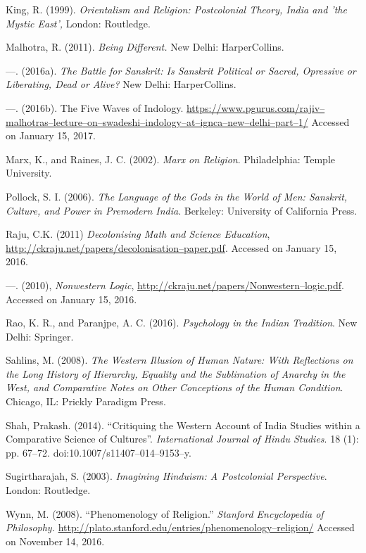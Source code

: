 \begin{thebibliography}{99}
  King, R. (1999). \textit{Orientalism and Religion: Postcolonial Theory, India and 'the Mystic East',} London: Routledge.

  Malhotra, R. (2011). \textit{Being Different.} New Delhi: HarperCollins.

  —. (2016a). \textit{The Battle for Sanskrit: Is Sanskrit Political or Sacred, Opressive or Liberating, Dead or Alive?} New Delhi: HarperCollins.

  —. (2016b). The Five Waves of Indology. \url{https://www.pgurus.com/rajiv–malhotras–lecture–on–swadeshi–indology–at–ignca–new–delhi–part–1/} Accessed on January 15, 2017.

  Marx, K., and Raines, J. C. (2002). \textit{Marx on Religion}. Philadelphia: Temple University.

  Pollock, S. I. (2006). \textit{The Language of the Gods in the World of Men: Sanskrit, Culture, and Power in Premodern India}. Berkeley: University of California Press.

  Raju, C.K. (2011) \textit{Decolonising Math and Science Education}, \url{http://ckraju.net/papers/decolonisation–paper.pdf}. Accessed on January 15, 2016.

  —. (2010), \textit{Nonwestern Logic}, \url{http://ckraju.net/papers/Nonwestern–logic.pdf}. Accessed on January 15, 2016.

  Rao, K. R., and Paranjpe, A. C. (2016). \textit{Psychology in the Indian Tradition}. New Delhi: Springer.

  Sahlins, M. (2008). \textit{The Western Illusion of Human Nature: With Reflections on the Long History of Hierarchy, Equality and the Sublimation of Anarchy in the West, and Comparative Notes on Other Conceptions of the Human Condition}. Chicago, IL: Prickly Paradigm Press.

  Shah, Prakash. (2014). “Critiquing the Western Account of India Studies within a Comparative Science of Cultures”. \textit{International Journal of Hindu Studies}. 18 (1): pp. 67–72. doi:10.1007/s11407–014–9153–y.

  Sugirtharajah, S. (2003). \textit{Imagining Hinduism: A Postcolonial Perspective}. London: Routledge.

  Wynn, M. (2008). “Phenomenology of Religion.” \textit{Stanford Encyclopedia of Philosophy.} \url{http://plato.stanford.edu/entries/phenomenology–religion/} Accessed on November 14, 2016.

 \end{thebibliography}


